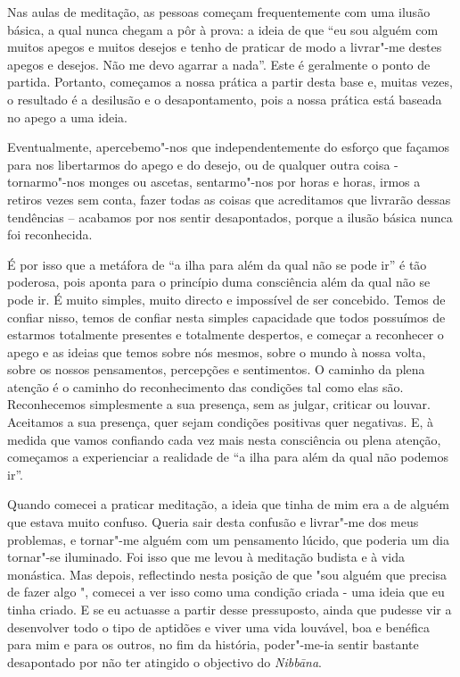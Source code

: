 Nas aulas de meditação, as pessoas começam frequentemente com uma ilusão
básica, a qual nunca chegam a pôr à prova: a ideia de que ``eu sou
alguém com muitos apegos e muitos desejos e tenho de praticar de modo a
livrar"-me destes apegos e desejos. Não me devo agarrar a nada''. Este é
geralmente o ponto de partida. Portanto, começamos a nossa prática a
partir desta base e, muitas vezes, o resultado é a desilusão e o
desapontamento, pois a nossa prática está baseada no apego a uma ideia.

Eventualmente, apercebemo"-nos que independentemente do esforço que
façamos para nos libertarmos do apego e do desejo, ou de qualquer outra
coisa - tornarmo"-nos monges ou ascetas, sentarmo"-nos por horas e horas,
irmos a retiros vezes sem conta, fazer todas as coisas que acreditamos
que livrarão dessas tendências -- acabamos por nos sentir desapontados,
porque a ilusão básica nunca foi reconhecida.

É por isso que a metáfora de ``a ilha para além da qual não se pode ir''
é tão poderosa, pois aponta para o princípio duma consciência além da
qual não se pode ir. É muito simples, muito directo e impossível de ser
concebido. Temos de confiar nisso, temos de confiar nesta simples
capacidade que todos possuímos de estarmos totalmente presentes e
totalmente despertos, e começar a reconhecer o apego e as ideias que
temos sobre nós mesmos, sobre o mundo à nossa volta, sobre os nossos
pensamentos, percepções e sentimentos. O caminho da plena atenção é o
caminho do reconhecimento das condições tal como elas são. Reconhecemos
simplesmente a sua presença, sem as julgar, criticar ou louvar.
Aceitamos a sua presença, quer sejam condições positivas quer negativas.
E, à medida que vamos confiando cada vez mais nesta consciência ou plena
atenção, começamos a experienciar a realidade de ``a ilha para além da
qual não podemos ir''.

Quando comecei a praticar meditação, a ideia que tinha de mim era a de
alguém que estava muito confuso. Queria sair desta confusão e livrar"-me
dos meus problemas, e tornar"-me alguém com um pensamento lúcido, que
poderia um dia tornar"-se iluminado. Foi isso que me levou à meditação
budista e à vida monástica. Mas depois, reflectindo nesta posição de que
"sou alguém que precisa de fazer algo ", comecei a ver isso como uma
condição criada - uma ideia que eu tinha criado. E se eu actuasse a
partir desse pressuposto, ainda que pudesse vir a desenvolver todo o
tipo de aptidões e viver uma vida louvável, boa e benéfica para mim e
para os outros, no fim da história, poder"-me-ia sentir bastante
desapontado por não ter atingido o objectivo do \emph{Nibbāna}.

